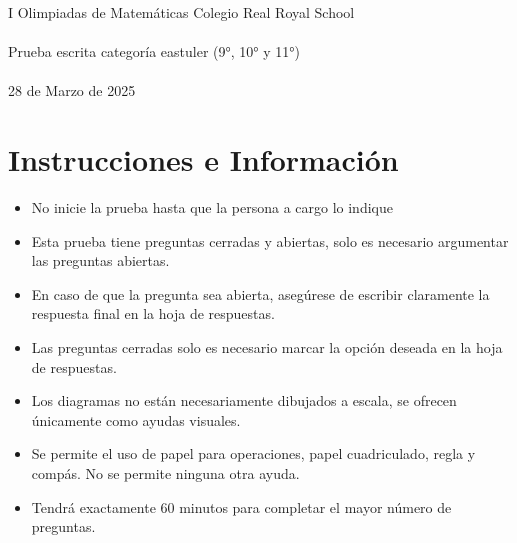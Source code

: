 \documentclass{article}
\begin{document}
\begin{center}
    \LARGE{I Olimpiadas de Matemáticas Colegio Real Royal School}
    \\~\\
    \large{Prueba escrita categoría eastuler (9°, 10° y 11°)}
    \\~\\
    \large{28 de Marzo de 2025}
\end{center}
\section{Instrucciones e Información}
\begin{itemize}
    \item No inicie la prueba hasta que la persona a cargo lo indique
    \item Esta prueba tiene preguntas cerradas y abiertas, solo es necesario argumentar las preguntas
          abiertas.
    \item En caso de que la pregunta sea abierta, asegúrese de escribir claramente la respuesta final en la hoja de respuestas.
    \item Las preguntas cerradas solo es necesario marcar la opción deseada en la hoja de respuestas.
    \item Los diagramas no están necesariamente dibujados a escala, se ofrecen únicamente como ayudas visuales.
    \item Se permite el uso de papel para operaciones, papel cuadriculado, regla y compás. No se
          permite ninguna otra ayuda.
    \item Tendrá exactamente 60 minutos para completar el mayor número de preguntas.
\end{itemize}
\end{document}
